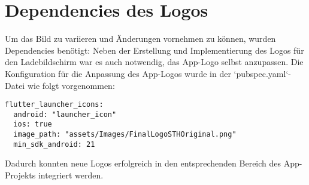 \section{Dependencies des Logos}
Um das Bild zu variieren und Änderungen vornehmen zu können, wurden Dependencies benötigt: Neben der Erstellung und Implementierung des Logos für den Ladebildschirm war es auch notwendig, das App-Logo selbst anzupassen. Die Konfiguration für die Anpassung des App-Logos wurde in der `pubspec.yaml`-Datei wie folgt vorgenommen:
\begin{verbatim}
flutter_launcher_icons:
  android: "launcher_icon"
  ios: true
  image_path: "assets/Images/FinalLogoSTHOriginal.png"
  min_sdk_android: 21
\end{verbatim}
Dadurch konnten neue Logos erfolgreich in den entsprechenden Bereich des App-Projekts integriert werden.
